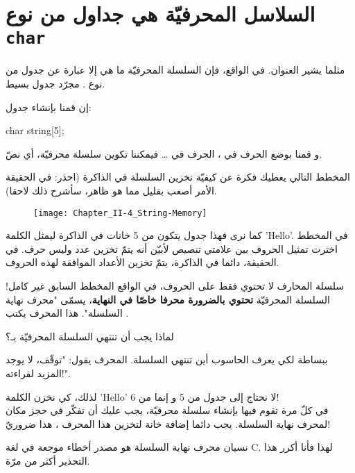 \section{السلاسل المحرفيّة هي جداول من نوع \texttt{char}}

مثلما يشير العنوان. في الواقع، فإن السلسلة المحرفيّة ما هي إلا عبارة عن جدول من نوع
.
مجرّد جدول بسيط.

إن قمنا بإنشاء جدول:

\begin{Csource}
char string[5];
\end{Csource}

و قمنا بوضع الحرف
في
،
الحرف
في
\dots
فيمكننا تكوين سلسلة محرفيّة، أي نصّ.

المخطط التالي يعطيك فكرة عن كيفيّة تخزين السلسلة في الذاكرة (احذر: في الحقيقة الأمر أصعب بقليل مما هو ظاهر، سأشرح ذلك لاحقا).

\begin{figure}[H]
	\centering
	\texttt{[image: Chapter\_II-4\_String-Memory]}
\end{figure}

كما نرى فهذا جدول يتكون من 5 خانات في الذاكرة ليمثل الكلمة
'\textenglish{Hello}'.
في المخطط اخترت تمثيل الحروف بين علامتي تنصيص  لأبيّن أنه يتمّ تخزين عدد وليس حرف. في الحقيقة، دائما في الذاكرة، يتمّ تخزين الأعداد الموافقة لهذه الحروف.

سلسلة المحارف لا تحتوي فقط على الحروف، في الواقع المخطط السابق غير كامل!
السلسلة المحرفيّة
\textbf{تحتوي بالضرورة محرفا خاصّا في النهاية}،
يسمّى "محرف نهاية السلسلة". هذا المحرف يكتب
.

\begin{question}
  لماذا يجب أن تنتهي السلسلة المحرفيّة بـ؟
\end{question}

ببساطة لكي يعرف الحاسوب أين تنتهي السلسلة. المحرف
يقول: "توقّف، لا يوجد المزيد لقراءته!".

لذلك، كي نخزن الكلمة
'\textenglish{Hello}'
 لا نحتاج إلى جدول من 5
و إنما من 6!\\
في كلّ مرة تقوم فيها بإنشاء سلسلة محرفيّة، يجب عليك أن تفكّر في حجز مكان لمحرف نهاية السلسلة. يجب دائما إضافة خانة لتخزين هذا المحرف
،
هذا ضروريٌ!

نسيان محرف نهاية السلسلة
هو مصدر أخطاء موجعة في لغة
\textenglish{C}.
لهذا فأنا أكرر هذا التحذير أكثر من مرّة.

